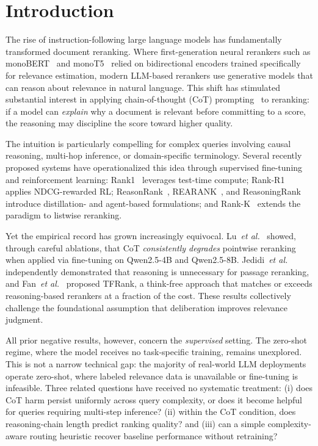 \documentclass[12pt]{article}
\newcommand{\CoT}{CoT}
\newcommand{\etal}{\textit{et al.}}
\begin{document}
\tableofcontents
\newpage

\section{Introduction}
\label{sec:intro}

The rise of instruction-following large language models has fundamentally
transformed document reranking.  Where first-generation neural
rerankers such as monoBERT~\citep{nogueira2019passage} and
monoT5~\citep{nogueira2020document} relied on bidirectional encoders trained
specifically for relevance estimation, modern LLM-based rerankers use
generative models that can reason about relevance in natural language.
This shift has stimulated substantial interest in applying chain-of-thought
(\CoT{}) prompting~\citep{wei2022chain} to reranking: if a model can
\emph{explain} why a document is relevant before committing to a score,
the reasoning may discipline the score toward higher quality.

The intuition is particularly compelling for complex queries involving causal
reasoning, multi-hop inference, or domain-specific terminology.  Several
recently proposed systems have operationalized this idea through supervised
fine-tuning and reinforcement learning:
Rank1~\citep{weller2025rank1} leverages test-time compute;
Rank-R1~\citep{zhuang2025rankr1} applies NDCG-rewarded RL;
ReasonRank~\citep{liu2025reasonrank}, REARANK~\citep{zhang2025rearank},
and ReasoningRank~\citep{ji2024reasoningrank} introduce distillation- and
agent-based formulations; and Rank-K~\citep{yang2025rankk} extends the
paradigm to listwise reranking.

Yet the empirical record has grown increasingly equivocal.
Lu~\etal~\citep{lu2025rethinking} showed, through careful ablations, that
\CoT{} \emph{consistently degrades} pointwise reranking when applied via
fine-tuning on Qwen2.5-4B and Qwen2.5-8B.  Jedidi~\etal~\citep{jedidi2025dont}
independently demonstrated that reasoning is unnecessary for passage reranking,
and Fan~\etal~\citep{fan2025tfrank} proposed TFRank, a think-free approach
that matches or exceeds reasoning-based rerankers at a fraction of the cost.
These results collectively challenge the foundational assumption that
deliberation improves relevance judgment.

All prior negative results, however, concern the \emph{supervised}
setting.  The zero-shot regime, where the model receives no task-specific
training, remains unexplored.  This is not a narrow technical gap: the majority
of real-world LLM deployments operate zero-shot, where labeled relevance data is
unavailable or fine-tuning is infeasible.  Three related questions have received
no systematic treatment: (i) does \CoT{} harm persist uniformly across query
complexity, or does it become helpful for queries requiring multi-step inference?
(ii) within the \CoT{} condition, does reasoning-chain length predict ranking
quality? and (iii) can a simple complexity-aware routing heuristic recover
baseline performance without retraining?
\end{document}
